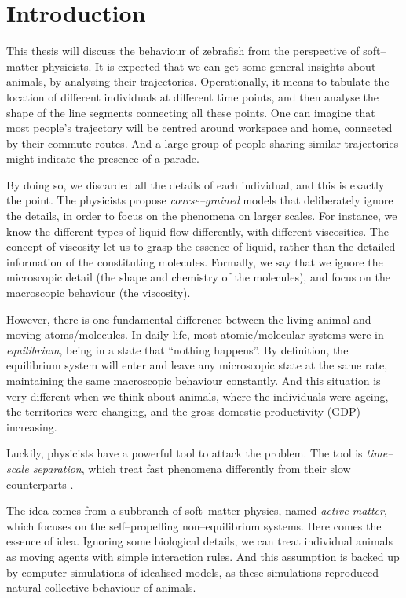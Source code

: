 \documentclass[11pt,twoside]{report}
\begin{document}
\chapter{Introduction}

This thesis will discuss the behaviour of zebrafish from the perspective of soft--matter physicists. It is expected that we can get some general insights about animals, by analysing their trajectories. Operationally, it means to tabulate the location of different individuals at different time points, and then analyse the shape of the line segments connecting all these points. One can imagine that most people's trajectory will be centred around workspace and home, connected by their commute routes. And a large group of people sharing similar trajectories might indicate the presence of a parade.

By doing so, we discarded all the details of each individual, and this is exactly the point. The physicists propose \emph{coarse--grained} models that deliberately ignore the details, in order to focus on the phenomena on larger scales. For instance, we know the different types of liquid flow differently, with different viscosities. The concept of viscosity let us to grasp the essence of liquid, rather than the detailed information of the constituting molecules. Formally, we say that we ignore the microscopic detail (the shape and chemistry of the molecules), and focus on the macroscopic behaviour (the viscosity).

However, there is one fundamental difference between the living animal and moving atoms/molecules. In daily life, most atomic/molecular systems were in \emph{equilibrium}, being in a state that ``nothing happens''. By definition, the equilibrium system will enter and leave any microscopic state at the same rate, maintaining the same macroscopic behaviour constantly. And this situation is very different when we think about animals, where the individuals were ageing, the territories were changing, and the gross domestic productivity (GDP) increasing.


Luckily, physicists have a powerful tool to attack the problem. The tool is \emph{time--scale separation}, which treat fast phenomena differently from their slow counterparts \cite{gunawardena2014}.


 The idea comes from a subbranch of soft--matter physics, named \emph{active matter}, which focuses on the self--propelling non--equilibrium systems.
Here comes the essence of idea. Ignoring some biological details, we can treat individual animals as moving agents with simple interaction rules. And this assumption is backed up by computer simulations of idealised models, as these simulations reproduced natural collective behaviour of animals.
\end{document}
